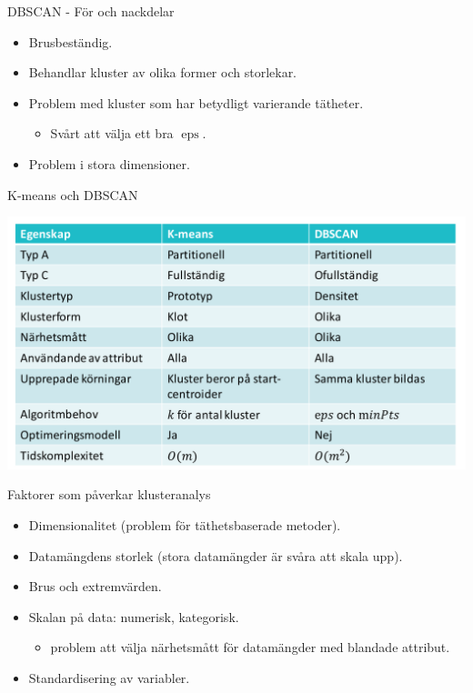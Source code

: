 \documentclass[10pt,english]{beamer}
\begin{document}
\begin{frame}{DBSCAN - För och nackdelar}

    \begin{itemize}
        \item Brusbeständig.
        \item Behandlar kluster av olika former och storlekar.
        \item Problem med kluster som har betydligt varierande tätheter.
        \begin{itemize}
            \item Svårt att välja ett bra $\operatorname{eps}$.
        \end{itemize}
        \item Problem i stora dimensioner.
    \end{itemize}
    
\end{frame}

\begin{frame}{K-means och DBSCAN}

    \includegraphics[width=\textwidth]{figs/compre_k-mean_DBACAN.png}
    
\end{frame}

\begin{frame}{Faktorer som påverkar klusteranalys}
    \begin{itemize}
        \item Dimensionalitet (problem för täthetsbaserade metoder).
        \item Datamängdens storlek (stora datamängder är svåra att skala upp).
        \item Brus och extremvärden.
        \item Skalan på data: numerisk, kategorisk.
        \begin{itemize}
            \item problem att välja närhetsmått för datamängder med blandade attribut.
        \end{itemize}
        \item Standardisering av variabler.
    \end{itemize}
\end{frame}
\end{document}

